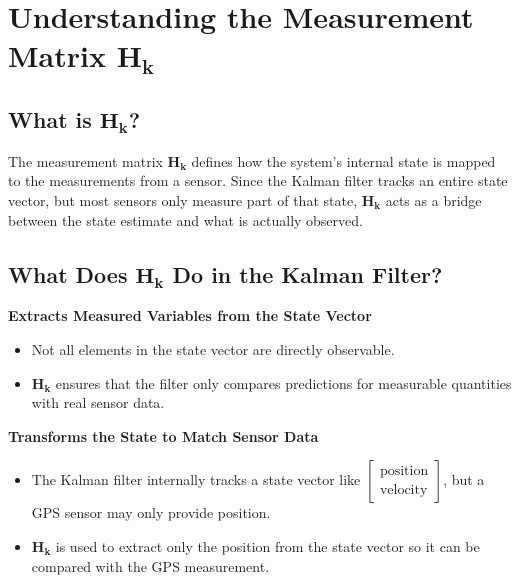 \documentclass{article}
\begin{document}
\newpage

\section{Understanding the Measurement Matrix \(\mathbf{H_k}\)}

\subsection{What is \(\mathbf{H_k}\)?}
The measurement matrix \(\mathbf{H_k}\) defines how the system’s internal state is mapped to the measurements from a sensor. Since the Kalman filter tracks an entire state vector, but most sensors only measure part of that state, \(\mathbf{H_k}\) acts as a bridge between the state estimate and what is actually observed.

\subsection*{What Does \(\mathbf{H_k}\) Do in the Kalman Filter?}
\textbf{Extracts Measured Variables from the State Vector}
\begin{itemize}
    \item Not all elements in the state vector are directly observable.
    \item \(\mathbf{H_k}\) ensures that the filter only compares predictions for measurable quantities with real sensor data.
\end{itemize}

\textbf{Transforms the State to Match Sensor Data}
\begin{itemize}
    \item The Kalman filter internally tracks a state vector like \(\begin{bmatrix} \text{position} \\ \text{velocity} \end{bmatrix}\), but a GPS sensor may only provide position.
    \item \(\mathbf{H_k}\) is used to extract only the position from the state vector so it can be compared with the GPS measurement.
\end{itemize}
\end{document}
